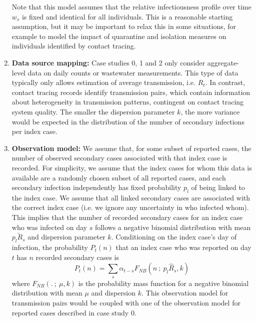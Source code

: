 \documentclass{article}
\begin{document}
\begin{enumerate}
    Note that this model assumes that the relative infectiousness profile over time $w_s$ is fixed and identical for all individuals. This is a reasonable starting assumption, but it may be important to relax this in some situations, for example to model the impact of quarantine and isolation measures on individuals identified by contact tracing.
    \item \textbf{Data source mapping:} Case studies 0, 1 and 2 only consider aggregate-level data on daily counts or wastewater measurements. This type of data typically only allows estimation of average transmission, i.e. $R_t$. In contrast, contact tracing records identify transmission pairs, which contain information about heterogeneity in transmission patterns, contingent on contact tracing system quality. The smaller the dispersion parameter $k$, the more variance would be expected in the distribution of the number of secondary infections per index case.
    \item \textbf{Observation model:} We assume that, for some subset of reported cases, the number of observed secondary cases associated with that index case is recorded. For simplicity, we assume that the index cases for whom this data is available are a randomly chosen subset of all reported cases, and each secondary infection independently has fixed probability $p_l$ of being linked to the index case. We assume that all linked secondary cases are associated with the correct index case (i.e. we ignore any uncertainty in who infected whom). This implies that the number of recorded secondary cases for an index case who was infected on day $s$ follows a negative binomial distribution with mean $p_l\tilde{R}_s$ and dispersion parameter $k$. Conditioning on the index case's day of infection, the probability $P_t(n)$ that an index case who was reported on day $t$ has $n$ recorded secondary cases is 
    \begin{equation}
    P_t(n) = \sum_s \alpha_{t-s} F_{NB}\left(n \ ; \ p_l\hat{R}_s, k\right) 
    \end{equation}
    where $F_{NB}(.\ ;\ \mu, k)$ is the probability mass function for a negative binomial distribution with mean $\mu$ and dispersion $k$.
    This observation model for transmission pairs would be coupled with one of the observation model for reported cases described in case study 0.
    

\end{enumerate}
\end{document}
